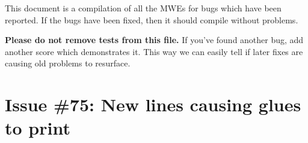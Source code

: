 \documentclass[11pt]{article}
\begin{document}
This document is a compilation of all the MWEs for bugs which have been reported.  If the bugs have been fixed, then it should compile without problems.

\textbf{Please do not remove tests from this file.}  If you've found another bug, add another score which demonstrates it.  This way we can easily tell if later fixes are causing old problems to resurface.


\section{Issue \#75: New lines causing glues to print}


\end{document}
